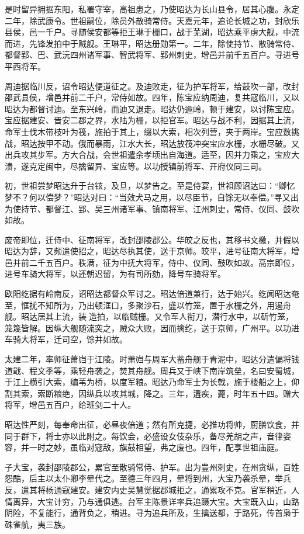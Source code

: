 \documentclass[]{article}
\begin{document}
是时留异拥据东阳，私署守宰，高祖患之，乃使昭达为长山县令，居其心腹。永定二年，除武康令。世祖嗣位，除员外散骑常侍。天嘉元年，追论长城之功，封欣乐县侯，邑一千户。寻随侯安都等拒王琳于栅口，战于芜湖，昭达乘平虏大舰，中流而进，先锋发拍中于贼舰。王琳平，昭达册勋第一。二年，除使持节、散骑常侍、都督郢、巴、武沅四州诸军事、智武将军、郢州刺史，增邑并前千五百户。寻进号平西将军。

周迪据临川反，诏令昭达便道征之。及迪败走，征为护军将军，给鼓吹一部，改封邵武县侯，增邑并前二千户，常侍如故。四年，陈宝应纳周迪，复共寇临川，又以昭达为都督讨迪。至东兴岭，而迪又退走。昭达仍逾岭，顿于建安，以讨陈宝应。宝应据建安、晋安二郡之界，水陆为栅，以拒官军。昭达与战不利，因据其上流，命军士伐木带枝叶为筏，施拍于其上，缀以大索，相次列营，夹于两岸。宝应数挑战，昭达按甲不动。俄而暴雨，江水大长，昭达放筏冲突宝应水栅，水栅尽破。又出兵攻其步军。方大合战，会世祖遣余孝顷出自海道。适至，因并力乘之，宝应大溃，遂克定闽中，尽擒留异、宝应等。以功授镇前将军、开府仪同三司。

初，世祖尝梦昭达升于台铉，及旦，以梦告之。至是侍宴，世祖顾诏达曰：``卿忆梦不？何以偿梦？''昭达对曰：``当效犬马之用，以尽臣节，自馀无以奉偿。''寻又出为使持节、都督江、郢、吴三州诸军事、镇南将军、江州刺史，常侍、仪同、鼓吹如故。

废帝即位，迁侍中、征南将军，改封邵陵郡公。华皎之反也，其移书文檄，并假以昭达为辞，又频遣使招之，昭达尽执其使，送于京师。皎平，进号征南大将军，增邑并前二千五百户。秩满，征为中抚大将军，侍中、仪同、鼓吹如故。高宗即位，进号车骑大将军，以还朝迟留，为有司所劾，降号车骑将军。

欧阳纥据有岭南反，诏昭达都督众军讨之。昭达倍道兼行，达于始兴。纥闻昭达奄至，恇扰不知所为，乃出顿洭口，多聚沙石，盛以竹笼，置于水栅之外，用遏舟舰。昭达居其上流，装造拍，以临贼栅。又令军人衔刀，潜行水中，以斫竹笼，笼篾皆解。因纵大舰随流突之，贼众大败，因而擒纥，送于京师，广州平。以功进车骑大将军，迁司空，馀并如故。

太建二年，率师征萧岿于江陵。时萧岿与周军大蓄舟舰于青泥中，昭达分遣偏将钱道戢、程文季等，乘轻舟袭之，焚其舟舰。周兵又于峡下南岸筑垒，名曰安蜀城，于江上横引大索，编苇为桥，以度军粮。昭达乃命军士为长戟，施于楼船之上，仰割其索，索断粮绝，因纵兵以攻其城，降之。三年，遘疾，薨，时年五十四。赠大将军，增邑五百户，给班剑二十人。

昭达性严刻，每奉命出征，必昼夜倍道；然有所克捷，必推功将帅，厨膳饮食，并同于群下，将士亦以此附之。每饮会，必盛设女伎杂乐，备尽羌胡之声，音律姿容，并一时之妙，虽临对寇敌，旗鼓相望，弗之废也。四年，配享世祖庙庭。

子大宝，袭封邵陵郡公，累官至散骑常侍、护军。出为豊州刺史，在州贪纵，百姓怨酷，后主以太仆卿李晕代之。至德三年四月，晕将到州，大宝乃袭杀晕，举兵反，遣其将杨通寇建安。建安内史吴慧觉据郡城拒之，通累攻不克。官军稍近，人情离异，大宝计穷，乃与通俱逃。台军主陈景详率兵追蹑大宝。大宝既入山，山路阴险，不复能行，通背负之，稍进。寻为追兵所及，生擒送都，于路死，传首枭于硃雀航，夷三族。
\end{document}
